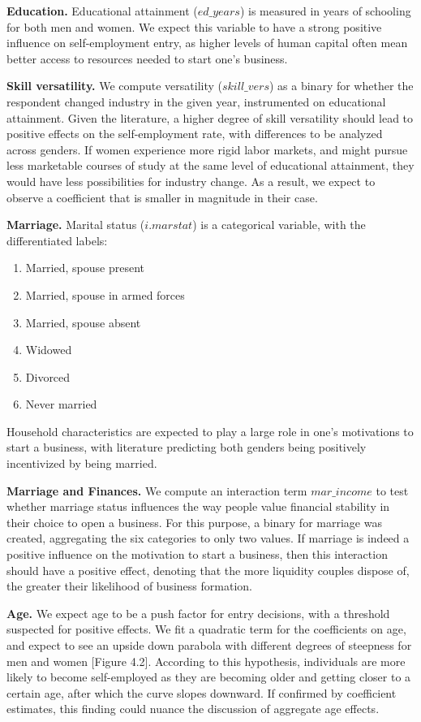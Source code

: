 \textbf{Education.} Educational attainment ($ed\_years$) is measured in years of schooling for both men and women. We expect this variable to have a strong positive influence on self-employment entry, as higher levels of human capital often mean better access to resources needed to start one's business. 

\textbf{Skill versatility.} We compute versatility ($skill\_vers$) as a binary for whether the respondent changed industry in the given year, instrumented on educational attainment. Given the literature, a higher degree of skill versatility should lead to positive effects on the self-employment rate, with differences to be analyzed across genders. If women experience more rigid labor markets, and might pursue less marketable courses of study at the same level of educational attainment, they would have less possibilities for industry change. As a result, we expect to observe a coefficient that is smaller in magnitude in their case. 

\textbf{Marriage.}  Marital status ($i.marstat$) is a categorical variable, with the differentiated labels:
\begin{enumerate}
\singlespacing
\item Married, spouse present
\item Married, spouse in armed forces
\item Married, spouse absent
\item Widowed
\item Divorced
\item Never married
\end{enumerate}

Household characteristics are expected to play a large role in one's motivations to start a business, with literature predicting both genders being positively incentivized by being married. 

\textbf{Marriage and Finances.} We compute an interaction term $mar\_income$ to test whether marriage status influences the way people value financial stability in their choice to open a business. For this purpose, a binary for marriage was created, aggregating the six categories to only two values. If marriage is indeed a positive influence on the motivation to start a business, then this interaction should have a positive effect, denoting that the more liquidity couples dispose of, the greater their likelihood of business formation. 

\textbf{Age.} We expect age to be a push factor for entry decisions, with a threshold suspected for positive effects. We fit a quadratic term for the coefficients on age, and expect to see an upside down parabola with different degrees of steepness for men and women [Figure 4.2]. According to this hypothesis, individuals are more likely to become self-employed as they are becoming older and getting closer to a certain age, after which the curve slopes downward. If confirmed by coefficient estimates, this finding could nuance the discussion of aggregate age effects. 

